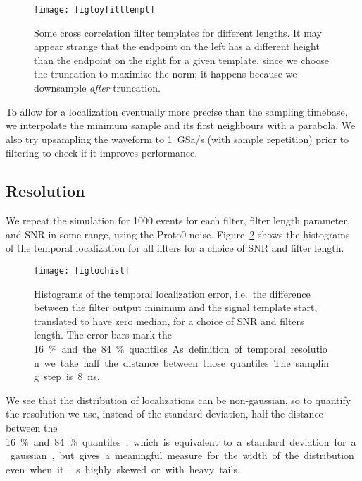 \begin{figure}
    \hspace{0.00\textwidth}
    \texttt{[image: figtoyfilttempl]}
    
    \caption{Some cross correlation filter templates for different lengths. It
    may appear strange that the endpoint on the left has a different height
    than the endpoint on the right for a given template, since we choose the
    truncation to maximize the norm; it happens because we downsample
    \emph{after} truncation.}
    
    \label{fig:toyfilttempl}
\end{figure}

To allow for a localization eventually more precise than the sampling timebase,
we interpolate the minimum sample and its first neighbours with a parabola. We
also try upsampling the waveform to \SI{1}{GSa/s} (with sample repetition)
prior to filtering to check if it improves performance.

\subsection{Resolution}

We repeat the simulation for 1000 events for each filter, filter length
parameter, and SNR in some range, using the Proto0 noise.
Figure~\ref{fig:lochist} shows the histograms of the temporal localization for
all filters for a choice of SNR and filter length.


\begin{figure}
    \hspace{-0.07\textwidth}
    \texttt{[image: figlochist]}
    
    \caption{Histograms of the temporal localization error, i.e.\ the
    difference between the filter output minimum and the signal template start,
    translated to have zero median, for a choice of SNR and filters length. The
    error bars mark the \SI{16}\% and the \SI{84}\% quantiles. As definition of
    temporal resolution we take half the distance between those quantiles.
    The sampling step is \SI{8}{ns}.}
    
    \label{fig:lochist}
\end{figure}

We see that the distribution of localizations can be non-gaussian, so to
quantify the resolution we use, instead of the standard deviation, half the
distance between the \SI{16}\% and \SI{84}\% quantiles, which is equivalent to
a standard deviation for a gaussian, but gives a meaningful measure for the
width of the distribution even when it's highly skewed or with heavy tails.

